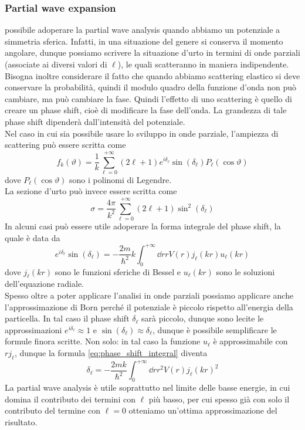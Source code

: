 \subsubsection*{Partial wave expansion}
   \E possibile adoperare la partial wave analysis quando abbiamo un potenziale a simmetria sferica. Infatti, in una situazione del genere si conserva il momento angolare, dunque possiamo scrivere la situazione d'urto in termini di onde parziali (associate ai diversi valori di $\ell$), le quali scatteranno in maniera indipendente.\\
   Bisogna inoltre considerare il fatto che quando abbiamo scattering elastico si deve conservare la probabilità, quindi il modulo quadro della funzione d'onda non può cambiare, ma può cambiare la fase. Quindi l'effetto di uno scattering è quello di creare un phase shift, cioè di modificare la fase dell'onda. La grandezza di tale phase shift dipenderà dall'intensità del potenziale.\\
   Nel caso in cui sia possibile usare lo sviluppo in onde parziale, l'ampiezza di scattering può essere scritta come
   \begin{equation*}
      f_k(\vartheta)
      =\frac{1}{k} \sum_{\ell=0}^{+\infty} (2\ell + 1) e^{i \delta_{\ell}} \sin{(\delta_{\ell})} P_{\ell}(\cos{\vartheta})
   \end{equation*}
   dove $P_{\ell}(\cos{\vartheta})$ sono i polinomi di Legendre.\\
   La sezione d'urto può invece essere scritta come
   \begin{equation*}
      \sigma
      =\frac{4\pi}{k^2} \sum_{\ell=0}^{+\infty} (2\ell + 1) \sin^2{(\delta_{\ell})}
   \end{equation*}
   In alcuni casi può essere utile adoperare la forma integrale del phase shift, la quale è data da
   \begin{equation}
      e^{i \delta_{\ell}} \sin{(\delta_{\ell})}
      =-\frac{2m}{\hbar^2} k \int_{0}^{+\infty} \dd{r} r V(r) j_{\ell}(kr) u_{\ell}(kr)
      \label{eq:phase_shift_integral}
   \end{equation}
   dove $j_{\ell}(kr)$ sono le funzioni sferiche di Bessel e $u_{\ell}(kr)$ sono le soluzioni dell'equazione radiale.\\
   Spesso oltre a poter applicare l'analisi in onde parziali possiamo applicare anche l'approssimazione di Born perché il potenziale è piccolo rispetto all'energia della particella. In tal caso il phase shift $\delta_{\ell}$ sarà piccolo, dunque sono lecite le approssimazioni $e^{i \delta_{\ell}} \approx 1$ e $\sin{(\delta_{\ell})} \approx \delta_{\ell}$, dunque è possibile semplificare le formule finora scritte. Non solo: in tal caso la funzione $u_{\ell}$ è approssimabile con $r j_{\ell}$, dunque la formula \eqref{eq:phase_shift_integral} diventa
   \begin{equation*}
      \delta_{\ell}
      =-\frac{2mk}{\hbar^2} \int_{0}^{+\infty} \dd{r} r^2 V(r) j_{\ell}(kr)^2
   \end{equation*}
   La partial wave analysis è utile soprattutto nel limite delle basse energie, in cui domina il contributo dei termini con $\ell$ più basso, per cui spesso già con solo il contributo del termine con $\ell=0$ otteniamo un'ottima approssimazione del risultato.